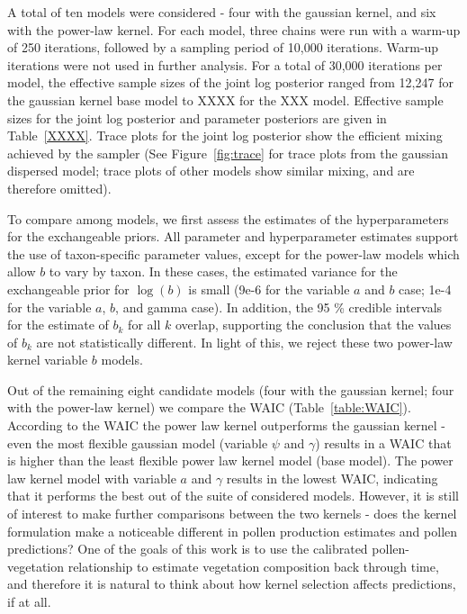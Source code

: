 \documentclass[12pt]{article}
\begin{document}
A total of ten models were considered - four with the gaussian kernel,
and six with the power-law kernel. For each model, three chains were
run with a warm-up of 250 iterations, followed by a sampling period of
10,000 iterations. Warm-up iterations were not used in further
analysis. For a total of 30,000 iterations per model, the effective
sample sizes of the joint log posterior ranged from 12,247 for the
gaussian kernel base model to XXXX for the XXX model. Effective sample
sizes for the joint log posterior and parameter posteriors are given
in Table~\ref{XXXX}. Trace plots for the joint log posterior show the
efficient mixing achieved by the sampler (See Figure~\ref{fig:trace}
for trace plots from the gaussian dispersed model; trace plots of
other models show similar mixing, and are therefore omitted).

To compare among models, we first assess the estimates of the
hyperparameters for the exchangeable priors. All parameter and
hyperparameter estimates support the use of taxon-specific parameter
values, except for the power-law models which allow $b$ to vary by
taxon. In these cases, the estimated variance for the exchangeable
prior for $\log ( b )$ is small (9e-6 for the variable $a$ and $b$ case;
1e-4 for the variable $a$, $b$, and gamma case). In addition, the 95 \%
credible intervals for the estimate of $b_k$ for all $k$ overlap,
supporting the conclusion that the values of $b_k$ are not
statistically different. In light of this, we reject these two
power-law kernel variable $b$ models. 

Out of the remaining eight candidate models (four with the gaussian
kernel; four with the power-law kernel) we compare the WAIC
(Table~\ref{table:WAIC}). According to the WAIC the power law kernel
outperforms the gaussian kernel - even the most flexible gaussian
model (variable $\psi$ and $\gamma$) results in a WAIC that is higher
than the least flexible power law kernel model (base model). The power
law kernel model with variable $a$ and $\gamma$ results in the lowest
WAIC, indicating that it performs the best out of the suite of
considered models. However, it is still of interest to make further
comparisons between the two kernels - does the kernel formulation make
a noticeable different in pollen production estimates and pollen
predictions? One of the goals of this work is to use the calibrated
pollen-vegetation relationship to estimate vegetation composition back
through time, and therefore it is natural to think about how kernel
selection affects predictions, if at all.
\end{document}
